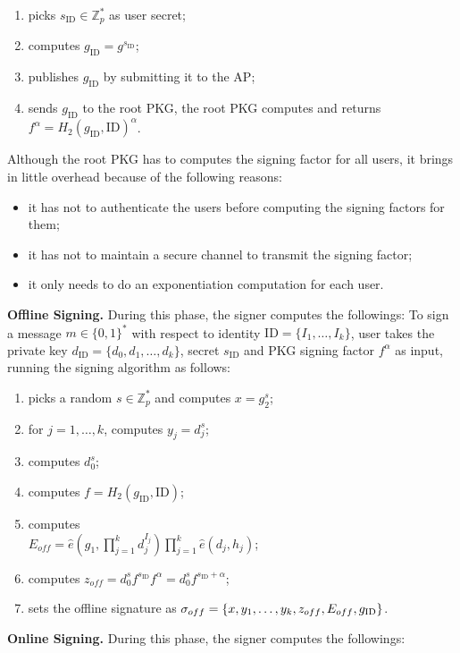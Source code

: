 \documentclass[times]{secauth}
\theoremstyle{definition}
\theoremstyle{remark}
\begin{document}
\begin{enumerate}
\item picks $s_{\mathrm{ID}} \in \mathbb{Z}_p^*$ as user secret;
\item computes $g_{\mathrm{ID}} = g^{s_{\mathrm{ID}}}$;
\item publishes $g_{\mathrm{ID}}$ by submitting it to the AP;
\item sends $g_{\mathrm{ID}}$ to the root PKG, the root PKG computes and returns $f^\alpha = H_2(g_\mathrm{ID}, \mathrm{ID})^\alpha$. 
\end{enumerate}
Although the root PKG has to computes the signing factor for all users, it brings in little overhead because of the following reasons:
\begin{itemize}
\item it has not to authenticate the users before computing the signing factors for them;
\item it has not to maintain a secure channel to transmit the signing factor;
\item it only needs to do an exponentiation computation for each user.
\end{itemize}
\textbf{Offline Signing.} 
During this phase, the signer computes the followings:
To sign a message $m \in \{0, 1\}^*$ with respect to identity $\mathrm{ID} = \{I_1, \ldots, I_k\}$, user takes the private key $d_{\mathrm{ID}} = \{d_0, d_1, \ldots, d_k\}$, secret $s_{\mathrm{ID}}$ and PKG signing factor $f^\alpha$ as input, running the signing algorithm as follows:
\begin{enumerate}
\item picks a random $s \in \mathbb{Z}_p^*$ and computes $x = g_2^s$;
\item for $j = 1, \ldots, k$, computes $y_j = d_j^{s}$;
\item computes $d_0^{s}$;
\item computes $f = H_2(g_\mathrm{ID}, \mathrm{ID})$;
\item computes\\$E_{off} = \hat{e}(g_1, \prod_{j=1}^{k} d_j^{I_j})\prod_{j=1}^{k} \hat{e}(d_j, h_j)$;
\item computes $z_{off} = d_0^sf^{s_\mathrm{ID}} f^\alpha = d_0^sf^{s_\mathrm{ID} + \alpha}$;
\item sets the offline signature as $\sigma_{off} = \{x, y_1, \ldots, y_k, \\z_{off}, E_{off}, g_{\mathrm{ID}}\}$.
\end{enumerate}
\textbf{Online Signing.}
During this phase, the signer computes the followings:
\end{document}
